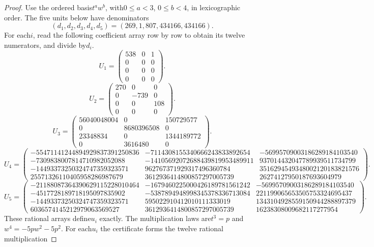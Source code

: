 \begin{proof}
Use the ordered basis$t^a w^b$, with$0\le a<3$, $0\le b<4$,
in lexicographic order.  The five units below have denominators
\[
                    (d_1,d_2,d_3,d_4,d_5)=(269,1,807,434166,434166).
 \tag{RQC.5}
\]
For each$i$, read the following coefficient array row by row to
obtain its twelve numerators, and divide by$d_i$.
\begingroup\scriptsize
\[
 U_1=\begin{pmatrix}
538&0&1\\
0&0&0\\
0&0&0\\
0&0&0
\end{pmatrix}.
\]
\[
 U_2=\begin{pmatrix}
270&0&0\\
0&-739&0\\
0&0&108\\
0&0&0
\end{pmatrix}.
\]
\[
 U_3=\begin{pmatrix}
56040048004&0&150729577\\
0&8680396508&0\\
23348834&0&1344189772\\
0&3616480&0
\end{pmatrix}.
\]
\[
 U_4=\begin{pmatrix}
-55471141244894929837391250836&-7114308155340666243833892654&-56995709003186289184103540\\
-7309838007814710982052088&-14105692072688439819953489911&937014432047789939511734799\\
-14493373250324747359323571&962767371929317496360784&3516294549348002120183821576\\
25571326110405958286987679&3612936414800857297005739&26274127950187693604979
\end{pmatrix}.
\]
\[
 U_5=\begin{pmatrix}
-21188087364390629115228010464&-1679460225000426189781561242&-56995709003186289184103540\\
-4517728189718195097835902&-5387894948998345378336713084&221199065653505753324695437\\
-14493373250324747359323571&595022910412010111333019&1343104928559150944288897379\\
6036574145212979063569527&3612936414800857297005739&16238308009682117277954
\end{pmatrix}.
\]
\endgroup
These rational arrays define$u_i$ exactly.  The multiplication laws
are$t^3=p$ and$w^4=-5pw^2-5p^2$.
For each$u_i$ the certificate forms the twelve rational multiplication

\end{proof}
